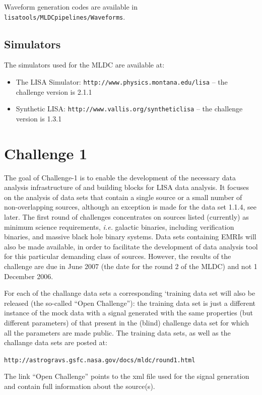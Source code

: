 \documentclass[11pt]{report}
\begin{document}
Waveform generation codes are available in {\tt lisatools/MLDCpipelines/Waveforms}.

\section{Simulators}

The simulators used for the MLDC are available at:

\begin{itemize}
\item The LISA Simulator: {\tt http://www.physics.montana.edu/lisa} -- the challenge version is 2.1.1
\item Synthetic LISA: {\tt http://www.vallis.org/syntheticlisa} -- the challenge version is 1.3.1
\end{itemize}


\chapter{Challenge 1}

The goal of Challenge-1 is to enable the development of the necessary data analysis infrastructure of and building blocks for LISA data analysis. It focuses on the analysis of data sets that contain a single source or a small number of non-overlapping sources, although an exception is made for the data set 1.1.4, see later. The first round of challenges concentrates on sources listed (currently) as minimum science requirements, {\em i.e.} galactic binaries, including verification binaries, and massive black hole binary systems. Data sets containing EMRIs will also be made available, in order to facilitate the development of data analysis tool for this particular demanding class of sources. However, the results of the challenge are due in June 2007 (the date for the round 2 of the MLDC) and not 1 December 2006.

For each of the challange data sets a corresponding `training data set will also be released (the so-called ``Open Challenge''): the training data set is just a different instance of the mock data with a signal generated with the same properties (but different parameters) of that present in the (blind) challenge data set for which all the parameters are made public. The training data sets, as well as the challange data sets are posted at:

{\tt http://astrogravs.gsfc.nasa.gov/docs/mldc/round1.html}

The link ``Open Challenge'' points to the xml file used for the signal generation and contain full information about the source(s).
\end{document}
